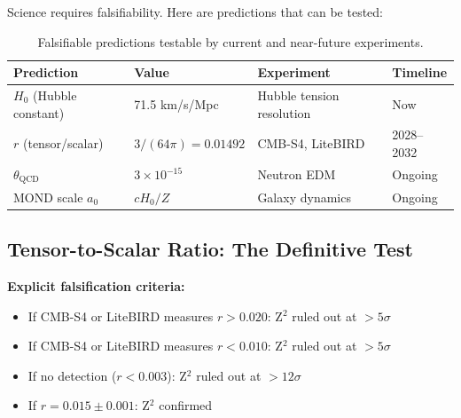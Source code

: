 \documentclass[11pt,a4paper]{article}
\theoremstyle{plain}
\theoremstyle{definition}
\theoremstyle{remark}
\begin{document}
Science requires falsifiability. Here are predictions that can be tested:

\begin{table}[h!]
\centering
\begin{tabular}{llll}
\toprule
\textbf{Prediction} & \textbf{Value} & \textbf{Experiment} & \textbf{Timeline} \\
\midrule
$H_0$ (Hubble constant) & 71.5 km/s/Mpc & Hubble tension resolution & Now \\
$r$ (tensor/scalar) & $3/(64\pi) = 0.01492$ & CMB-S4, LiteBIRD & 2028--2032 \\
$\theta_{\text{QCD}}$ & $3 \times 10^{-15}$ & Neutron EDM & Ongoing \\
MOND scale $a_0$ & $cH_0/Z$ & Galaxy dynamics & Ongoing \\
\bottomrule
\end{tabular}
\caption{Falsifiable predictions testable by current and near-future experiments.}
\end{table}

\subsection{Tensor-to-Scalar Ratio: The Definitive Test}

\begin{center}
\end{center}

\textbf{Explicit falsification criteria:}
\begin{itemize}
  \item If CMB-S4 or LiteBIRD measures $r > 0.020$: Z$^2$ ruled out at $>5\sigma$
  \item If CMB-S4 or LiteBIRD measures $r < 0.010$: Z$^2$ ruled out at $>5\sigma$
  \item If no detection ($r < 0.003$): Z$^2$ ruled out at $>12\sigma$
  \item If $r = 0.015 \pm 0.001$: Z$^2$ confirmed
\end{itemize}
\end{document}
